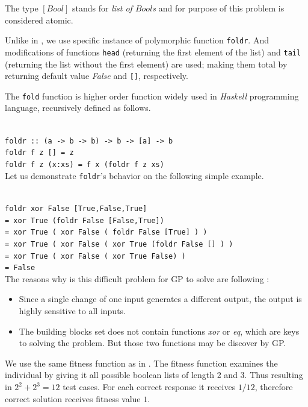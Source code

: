 \documentclass[12pt,a4paper]{report}
\newcommand{\Lets}{Let us\xspace}
\begin{document}
The type $[Bool]$ stands for \textit{list of $Bool$s} and for purpose of
this problem is considered atomic.

Unlike in \cite{yu01}, we use specific instance of polymorphic 
function \texttt{foldr}. 
And modifications of functions \texttt{head} 
(returning the first element of the list) 
and \texttt{tail} (returning the list without the first element) are used; 
making them total by returning default value \textit{False}
and \texttt{[]}, respectively.

The \texttt{fold} function is higher order function widely used in \textit{Haskell}
programming language, recursively defined as follows.

\texttt{~\\
foldr :: (a -> b -> b) -> b -> [a] -> b \\
foldr f z []     = z \\
foldr f z (x:xs) = f x (foldr f z xs)  
}\\

\Lets demonstrate \texttt{foldr}'s behavior on the following simple example.

\texttt{~\\
foldr xor False [True,False,True] \\
= xor True (foldr False [False,True]) \\
= xor True ( xor False ( foldr False [True] ) )\\
= xor True ( xor False ( xor True (foldr False [] ) )\\
= xor True ( xor False ( xor True False) )\\
= False
}\\

The reasons why is this difficult problem 
for GP to solve are following \cite{yu01}:

\begin{itemize}
 \item Since a single change of one input generates a different output,
       the output is highly sensitive to all inputs.
 \item The building blocks set does not contain functions \textit{xor}
       or \textit{eq}, which are keys to solving the problem.
       But those two functions may be discover by GP.  
\end{itemize}

We use the same fitness function as in \cite{yu01}. 
The fitness function examines the individual by giving
it all possible boolean lists of length 2 and 3.
Thus resulting in $2^2 + 2^3 = 12$ test cases.
For each correct response it receives $1/12$, 
therefore correct solution receives fitness value $1$.\\
\end{document}
